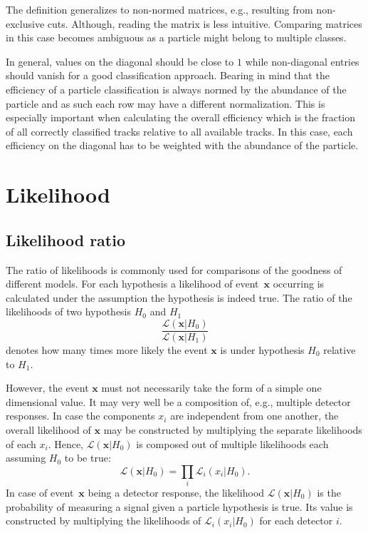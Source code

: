 The definition generalizes to non-normed matrices, e.g., resulting from non-exclusive cuts. Although, reading the matrix is less intuitive. Comparing matrices in this case becomes ambiguous as a particle might belong to multiple classes.

In general, values on the diagonal should be close to $1$ while non-diagonal entries should vanish for a good classification approach. Bearing in mind that the efficiency of a particle classification is always normed by the abundance of the particle and as such each row may have a different normalization. This is especially important when calculating the overall efficiency which is the fraction of all correctly classified tracks relative to all available tracks. In this case, each efficiency on the diagonal has to be weighted with the abundance of the particle.

\section{Likelihood}
\label{sec:likelihood}

\subsection{Likelihood ratio}
\label{subsec:likelihood_ratios}

The ratio of likelihoods is commonly used for comparisons of the goodness of different models. For each hypothesis a likelihood of event~$\pmb{x}$ occurring is calculated under the assumption the hypothesis is indeed true. The ratio of the likelihoods of two hypothesis $H_0$ and $H_1$
\begin{equation}
	\frac{\mathcal{L}(\pmb{x}|H_0)}{\mathcal{L}(\pmb{x}|H_1)}
\end{equation}
denotes how many times more likely the event $\pmb{x}$ is under hypothesis $H_0$ relative to $H_1$.

However, the event $\pmb{x}$ must not necessarily take the form of a simple one dimensional value. It may very well be a composition of, e.g., multiple detector responses. In case the components $x_i$ are independent from one another, the overall likelihood of $\pmb{x}$ may be constructed by multiplying the separate likelihoods of each $x_i$. Hence, $\mathcal{L}(\pmb{x}|H_0)$ is composed out of multiple likelihoods each assuming $H_0$ to be true:
\begin{equation}
	\mathcal{L}(\pmb{x}|H_0) = \prod \limits_{i} \mathcal{L}_i(x_i|H_0).
\end{equation}
In case of event~$\pmb{x}$ being a detector response, the likelihood $\mathcal{L}(\pmb{x}|H_0)$ is the probability of measuring a signal given a particle hypothesis is true. Its value is constructed by multiplying the likelihoods of $\mathcal{L}_i(x_i|H_0)$ for each detector $i$.

